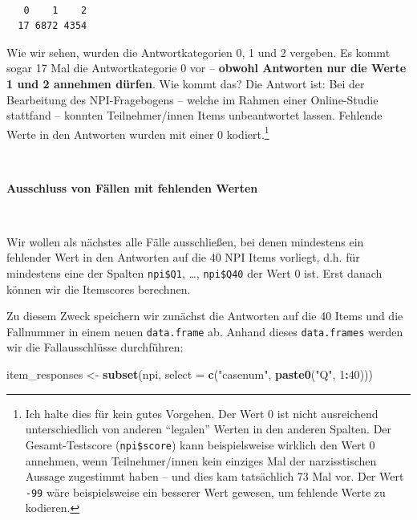 \documentclass[12pt,]{tufte-book}
\newenvironment{Shaded}{\begin{snugshade}}{\end{snugshade}}
\newcommand{\KeywordTok}[1]{\textcolor[rgb]{0.13,0.29,0.53}{\textbf{#1}}}
\newcommand{\DataTypeTok}[1]{\textcolor[rgb]{0.13,0.29,0.53}{#1}}
\newcommand{\DecValTok}[1]{\textcolor[rgb]{0.00,0.00,0.81}{#1}}
\newcommand{\StringTok}[1]{\textcolor[rgb]{0.31,0.60,0.02}{#1}}
\newcommand{\OperatorTok}[1]{\textcolor[rgb]{0.81,0.36,0.00}{\textbf{#1}}}
\newcommand{\NormalTok}[1]{#1}
\theoremstyle{definition}
\theoremstyle{definition}
\theoremstyle{definition}
\theoremstyle{remark}
\begin{document}
\begin{verbatim}

   0    1    2 
  17 6872 4354 
\end{verbatim}

Wie wir sehen, wurden die Antwortkategorien 0, 1 und 2 vergeben. Es
kommt sogar 17 Mal die Antwortkategorie 0 vor -- \textbf{obwohl
Antworten nur die Werte 1 und 2 annehmen dürfen}. Wie kommt das? Die
Antwort ist: Bei der Bearbeitung des NPI-Fragebogens -- welche im Rahmen
einer Online-Studie stattfand -- konnten Teilnehmer/innen Items
unbeantwortet lassen. Fehlende Werte in den Antworten wurden mit einer 0
kodiert.\footnote{Ich halte dies für kein gutes Vorgehen. Der Wert 0 ist
  nicht ausreichend unterschiedlich von anderen ``legalen'' Werten in
  den anderen Spalten. Der Gesamt-Testscore (\texttt{npi\$score}) kann
  beispielsweise wirklich den Wert 0 annehmen, wenn Teilnehmer/innen
  kein einziges Mal der narzisstischen Aussage zugestimmt haben -- und
  dies kam tatsächlich 73 Mal vor. Der Wert \texttt{-99} wäre
  beispielsweise ein besserer Wert gewesen, um fehlende Werte zu
  kodieren.}

~

\textbf{Ausschluss von Fällen mit fehlenden Werten}

~

Wir wollen als nächstes alle Fälle ausschließen, bei denen mindestens
ein fehlender Wert in den Antworten auf die 40 NPI Items vorliegt, d.h.
für mindestens eine der Spalten \texttt{npi\$Q1}, \ldots{},
\texttt{npi\$Q40} der Wert 0 ist. Erst danach können wir die Itemscores
berechnen.

Zu diesem Zweck speichern wir zunächst die Antworten auf die 40 Items
und die Fallnummer in einem neuen \texttt{data.frame} ab. Anhand dieses
\texttt{data.frames} werden wir die Fallausschlüsse durchführen:

\begin{Shaded}
\begin{Highlighting}[]
\NormalTok{item_responses <-}\StringTok{ }\KeywordTok{subset}\NormalTok{(npi, }\DataTypeTok{select =} \KeywordTok{c}\NormalTok{(}\StringTok{"casenum"}\NormalTok{, }
    \KeywordTok{paste0}\NormalTok{(}\StringTok{"Q"}\NormalTok{, }\DecValTok{1}\OperatorTok{:}\DecValTok{40}\NormalTok{)))}
\end{Highlighting}
\end{Shaded}
\end{document}
